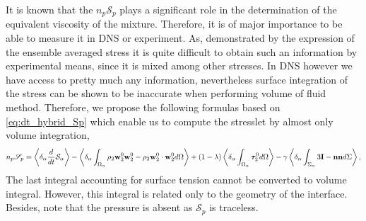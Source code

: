 It is known that the $n_p \mathscr{S}_p$ plays a significant role in the determination of the equivalent viscosity of the mixture. 
Therefore, it is of major importance to be able to measure it in DNS or experiment.
As, demonstrated by the expression of the ensemble averaged stress it is quite difficult to obtain such an information by experimental means, since it is mixed among other stresses.  
In DNS however we have access to pretty much any information, nevertheless surface integration of the stress can be shown to be inaccurate when performing volume of fluid method. 
Therefore, we propose the following formulas based on \ref{eq:dt_hybrid_Sp} which enable us to compute the stresslet by almost only volume integration,  
\begin{equation}
    n_p  \mathscr{S}_p
    =
    \left<\delta_\alpha \frac{d}{d t}{\mathcal{S}_\alpha}\right>
- \left<\delta_\alpha \int_{\Omega_\alpha} \rho_2 \textbf{w}_2^0  \textbf{w}_2^0 - \rho_2 \textbf{w}_2^0 \cdot  \textbf{w}_2^0  d\Omega\right>
+ (1-\lambda)\left<\delta_\alpha \int_{\Omega_\alpha} \bm{\tau}_2^0 d\Omega\right>
-  \gamma \left<\delta_\alpha \int_{\Sigma_\alpha} 3\textbf{I} - \textbf{nn} d\Sigma\right>,
\end{equation}
The last integral accounting for surface tension cannot be converted to volume integral. 
However, this integral is related only to the geometry of the interface. 
Besides, note that the pressure is absent as $\mathscr{S}_p$ is traceless. 


